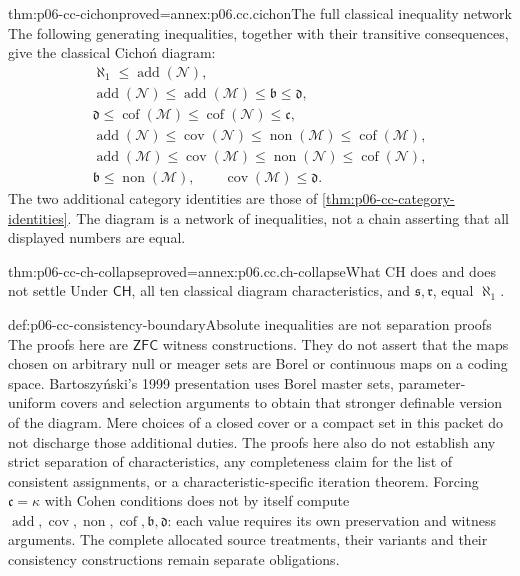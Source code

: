 \begin{hbtheorem}{thm:p06-cc-cichon}{proved=annex:p06.cc.cichon}{The full classical inequality network}
The following generating inequalities, together
with their transitive consequences, give the classical Cicho\'n diagram:
\[
\begin{gathered}
\aleph_1\leq\operatorname{add}(\mathcal N),\\
\operatorname{add}(\mathcal N)\leq\operatorname{add}(\mathcal M)
 \leq\mathfrak b\leq\mathfrak d,\\
\mathfrak d\leq\operatorname{cof}(\mathcal M)
 \leq\operatorname{cof}(\mathcal N)\leq\mathfrak c,\\
\operatorname{add}(\mathcal N)\leq\operatorname{cov}(\mathcal N)
 \leq\operatorname{non}(\mathcal M)\leq\operatorname{cof}(\mathcal M),\\
\operatorname{add}(\mathcal M)\leq\operatorname{cov}(\mathcal M)
 \leq\operatorname{non}(\mathcal N)\leq\operatorname{cof}(\mathcal N),\\
\mathfrak b\leq\operatorname{non}(\mathcal M),\qquad
\operatorname{cov}(\mathcal M)\leq\mathfrak d.
\end{gathered}
\]
The two additional category identities are those of
\cref{thm:p06-cc-category-identities}. The diagram is a network of
inequalities, not a chain asserting that all displayed numbers are equal.
\end{hbtheorem}

\begin{hbcorollary}{thm:p06-cc-ch-collapse}{proved=annex:p06.cc.ch-collapse}{What CH does and does not settle}
Under \(\mathsf{CH}\), all ten classical diagram characteristics, and
\(\mathfrak s,\mathfrak r\), equal \(\aleph_1\).
\end{hbcorollary}

\begin{proofboundary}{def:p06-cc-consistency-boundary}{Absolute inequalities are not separation proofs}
The proofs here are \(\mathsf{ZFC}\) witness constructions. They do not
assert that the maps chosen on arbitrary null or meager sets are Borel
or continuous maps on a coding space. Bartoszy\'nski's 1999 presentation
uses Borel master sets, parameter-uniform covers and selection arguments
to obtain that stronger definable version of the diagram. Mere choices
of a closed cover or a compact set in this packet do not discharge those
additional duties.
The proofs here also do not
establish any strict separation of characteristics, any completeness claim
for the list of consistent assignments, or a characteristic-specific
iteration theorem. Forcing \(\mathfrak c=\kappa\) with Cohen conditions
does not by itself compute \(\operatorname{add},\operatorname{cov},
\operatorname{non},\operatorname{cof},\mathfrak b,\mathfrak d\): each value
requires its own preservation and witness arguments. The complete allocated
source treatments, their variants and their consistency constructions
remain separate obligations.
\end{proofboundary}

